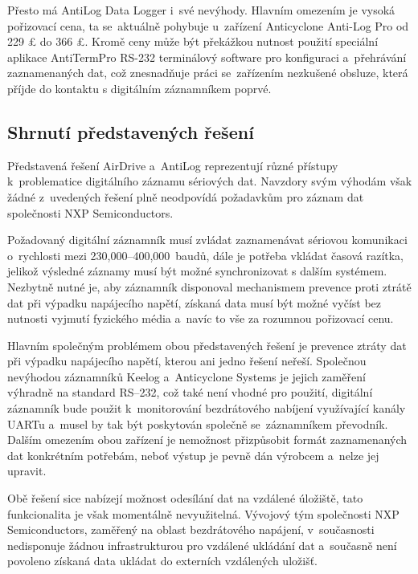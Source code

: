 Přesto má AntiLog Data Logger i~své nevýhody. Hlavním omezením je vysoká pořizovací cena, ta se~aktuálně pohybuje u~zařízení Anticyclone Anti-Log Pro od 229 £ do 366 £. Kromě ceny může být překážkou nutnost použití speciální aplikace AntiTermPro RS-232 terminálový software pro konfiguraci a~přehrávání zaznamenaných dat, což znesnadňuje práci se~zařízením nezkušené obsluze, která příjde do kontaktu s digitálním záznamníkem poprvé.~\cite{anticyclone_systems_antilog_pro, anticyclone_systems_antilog_pro_price}

\subsection{Shrnutí představených řešení}

Představená řešení AirDrive a~AntiLog reprezentují různé přístupy k~problematice digitálního záznamu sériových dat. Navzdory svým výhodám však žádné z~uvedených řešení plně neodpovídá požadavkům pro záznam dat společnosti NXP Semiconductors. 

Požadovaný digitální záznamník musí zvládat zaznamenávat sériovou komunikaci o~rychlosti mezi 230,000--400,000~baudů, dále je potřeba vkládat časová razítka, jelikož výsledné záznamy musí být možné synchronizovat s dalším systémem. Nezbytně nutné je, aby záznamník disponoval mechanismem prevence proti ztrátě dat při výpadku napájecího napětí, získaná data musí být možné vyčíst bez nutnosti vyjmutí fyzického média a~navíc to vše za rozumnou pořizovací cenu.

Hlavním společným problémem obou představených řešení je prevence ztráty dat při výpadku napájecího napětí, kterou ani jedno řešení neřeší. Společnou nevýhodou záznamníků Keelog a~Anticyclone Systems je jejich zaměření výhradně na standard RS--232, což také není vhodné pro použití, digitální záznamník bude použit k~monitorování bezdrátového nabíjení využívající kanály UARTu a~musel by tak být poskytován společně se~záznamníkem převodník. Dalším omezením obou zařízení je nemožnost přizpůsobit formát zaznamenaných dat konkrétním potřebám, neboť výstup je pevně dán výrobcem a~nelze jej upravit.

Obě řešení sice nabízejí možnost odesílání dat na vzdálené úložiště, tato funkcionalita je však momentálně nevyužitelná. Vývojový tým společnosti NXP Semiconductors, zaměřený na oblast bezdrátového napájení, v~současnosti nedisponuje žádnou infrastrukturou pro vzdálené ukládání dat a~současně není povoleno získaná data ukládat do externích vzdálených uložišť.

